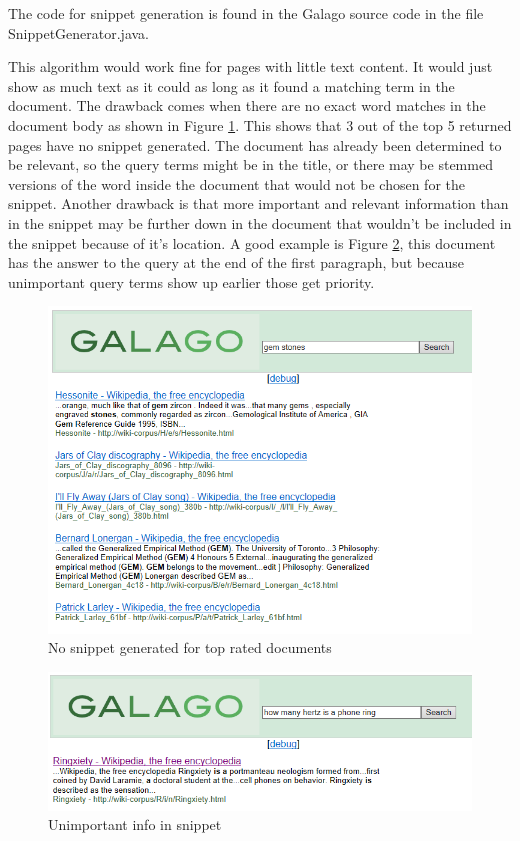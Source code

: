 \documentclass[letterpaper,12pt]{article}
\begin{document}
The code for snippet generation is found in the Galago source code in the file SnippetGenerator.java.

This algorithm would work fine for pages with little text content. It would just show as much text as it could as long as it found a matching term in the document. The drawback comes when there are no exact word matches in the document body as shown in Figure \ref{nosnippet}. This shows that 3 out of the top 5 returned pages have no snippet generated. The document has already been determined to be relevant, so the query terms might be in the title, or there may be stemmed versions of the word inside the document that would not be chosen for the snippet. Another drawback is that more important and relevant information than  in the snippet may be further down in the document that wouldn't be included in the snippet because of it's location. A good example is Figure \ref{badsnippet}, this document has the answer to the query at the end of the first paragraph, but because unimportant query terms show up earlier those get priority. 

\begin{figure}[h]
\centering
\includegraphics[scale=0.75]{data/65nosnippet.png}
\caption{No snippet generated for top rated documents}
\label{nosnippet}
\end{figure}

\begin{figure}[h]
\centering
\includegraphics[scale=0.75]{data/65importantInfo.png}
\caption{Unimportant info in snippet}
\label{badsnippet}
\end{figure}
\end{document}
